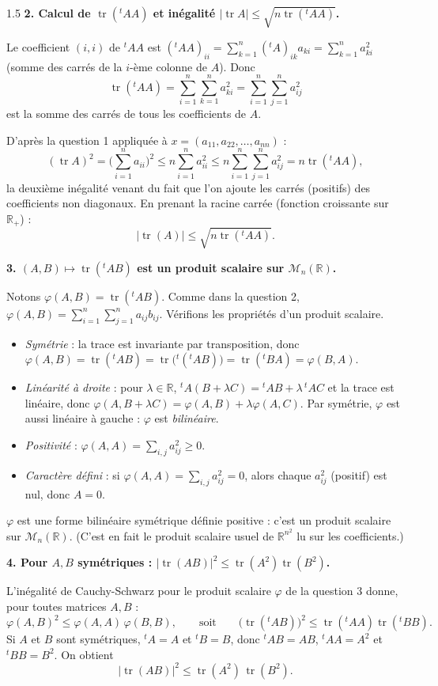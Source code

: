 \documentclass[12pt]{article}
\begin{document}
\begin{spacing}{1.5}
\textbf{2. Calcul de $\operatorname{tr}({}^tAA)$ et inégalité $|\operatorname{tr}A|\le\sqrt{n\operatorname{tr}({}^tAA)}$.}

Le coefficient $(i,i)$ de ${}^tAA$ est $\displaystyle({}^tAA)_{ii}=\sum_{k=1}^n({}^tA)_{ik}a_{ki}=\sum_{k=1}^na_{ki}^2$ (somme des carrés de la $i$-ème colonne de $A$). Donc
\[
\boxed{\operatorname{tr}({}^tAA)=\sum_{i=1}^n\sum_{k=1}^na_{ki}^2=\sum_{i=1}^n\sum_{j=1}^na_{ij}^2}
\]
est la somme des carrés de tous les coefficients de $A$.

D'après la question 1 appliquée à $x=(a_{11},a_{22},\dots,a_{nn})$ :
\[
(\operatorname{tr}A)^2=\Big(\sum_{i=1}^na_{ii}\Big)^2\le n\sum_{i=1}^na_{ii}^2\le n\sum_{i=1}^n\sum_{j=1}^na_{ij}^2=n\operatorname{tr}({}^tAA),
\]
la deuxième inégalité venant du fait que l'on ajoute les carrés (positifs) des coefficients non diagonaux. En prenant la racine carrée (fonction croissante sur $\mathbb{R}_+$) :
\[
|\operatorname{tr}(A)|\le\sqrt{n\operatorname{tr}({}^tAA)} .
\]

\textbf{3. $(A,B)\mapsto\operatorname{tr}({}^tAB)$ est un produit scalaire sur $\mathcal{M}_n(\mathbb{R})$.}

Notons $\varphi(A,B)=\operatorname{tr}({}^tAB)$. Comme dans la question 2, $\varphi(A,B)=\displaystyle\sum_{i=1}^n\sum_{j=1}^na_{ij}b_{ij}$. Vérifions les propriétés d'un produit scalaire.
\begin{itemize}
\item \emph{Symétrie} : la trace est invariante par transposition, donc $\varphi(A,B)=\operatorname{tr}({}^tAB)=\operatorname{tr}\big({}^t({}^tAB)\big)=\operatorname{tr}({}^tBA)=\varphi(B,A)$.
\item \emph{Linéarité à droite} : pour $\lambda\in\mathbb{R}$, ${}^tA(B+\lambda C)={}^tAB+\lambda\,{}^tAC$ et la trace est linéaire, donc $\varphi(A,B+\lambda C)=\varphi(A,B)+\lambda\varphi(A,C)$. Par symétrie, $\varphi$ est aussi linéaire à gauche : $\varphi$ est \emph{bilinéaire}.
\item \emph{Positivité} : $\varphi(A,A)=\displaystyle\sum_{i,j}a_{ij}^2\ge0$.
\item \emph{Caractère défini} : si $\varphi(A,A)=\sum_{i,j}a_{ij}^2=0$, alors chaque $a_{ij}^2$ (positif) est nul, donc $A=0$.
\end{itemize}
$\varphi$ est une forme bilinéaire symétrique définie positive : c'est un produit scalaire sur $\mathcal{M}_n(\mathbb{R})$. (C'est en fait le produit scalaire usuel de $\mathbb{R}^{n^2}$ lu sur les coefficients.)

\textbf{4. Pour $A,B$ symétriques : $|\operatorname{tr}(AB)|^2\le\operatorname{tr}(A^2)\operatorname{tr}(B^2)$.}

L'inégalité de Cauchy-Schwarz pour le produit scalaire $\varphi$ de la question 3 donne, pour toutes matrices $A,B$ :
\[
\varphi(A,B)^2\le\varphi(A,A)\,\varphi(B,B),\qquad\text{soit}\qquad \big(\operatorname{tr}({}^tAB)\big)^2\le\operatorname{tr}({}^tAA)\operatorname{tr}({}^tBB).
\]
Si $A$ et $B$ sont symétriques, ${}^tA=A$ et ${}^tB=B$, donc ${}^tAB=AB$, ${}^tAA=A^2$ et ${}^tBB=B^2$. On obtient
\[
|\operatorname{tr}(AB)|^2\le\operatorname{tr}(A^2)\,\operatorname{tr}(B^2).
\]

\end{spacing}
\end{document}
